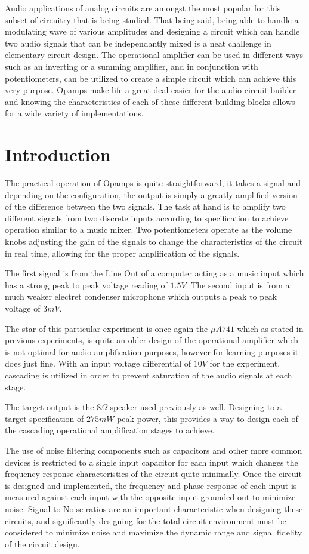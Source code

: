 \documentclass[12pt]{article}
\begin{document}
Audio applications of analog circuits are amongst the most
popular for this subset of circuitry that is being studied. That being said,
being able to handle a modulating wave of various amplitudes and designing a
circuit which can handle two audio signals that can be independantly mixed is a
neat challenge in elementary circuit design. The operational amplifier can be
used in different ways such as an inverting or a summing amplifier, and in
conjunction with potentiometers, can be utilized to create a simple circuit
which can achieve this very purpose. Opamps make life a great deal easier for
the audio circuit builder and knowing the characteristics of each of these
different building blocks allows for a wide variety of implementations.
\newpage
\section{Introduction}
The practical operation of Opamps is quite straightforward, it takes a signal
and depending on the configuration, the output is simply a greatly amplified
version of the difference between the two signals. The task at hand is to
amplify two different signals from two discrete inputs according to
specification to achieve operation similar to a music mixer. Two potentiometers
operate as the volume knobs adjusting the gain of the signals to change the
characteristics of the circuit in real time, allowing for the proper
amplification of the signals.

The first signal is from the Line Out of a computer acting as a music input
which has a strong peak to peak voltage reading of $1.5V$. The second input is
from a much weaker electret condenser microphone which outputs a peak to peak
voltage of $3mV$.

The star of this particular experiment is once again the $\mu A741$ which as
stated in previous experiments, is quite an older design of the operational
amplifier which is not optimal for audio amplification purposes, however for
learning purposes it does just fine. With an input voltage differential of
$10V$ for the experiment, cascading is utilized in order to prevent saturation
of the audio signals at each stage.

The target output is the $8\Omega$ speaker used previously as well. Designing to
a target specification of $275mW$ peak power, this provides a way to design each
of the cascading operational amplification stages to achieve.

The use of noise filtering components such as capacitors and other more common
devices is restricted to a single input capacitor for each input which changes
the frequency response characteristics of the circuit quite minimally. Once the
circuit is designed and implemented, the frequency and phase response of each
input is measured against each input with the opposite input grounded out to
minimize noise. Signal-to-Noise ratios are an important characteristic when
designing these circuits, and significantly designing for the total circuit
environment must be considered to minimize noise and maximize the dynamic range
and signal fidelity of the circuit design.
\end{document}
